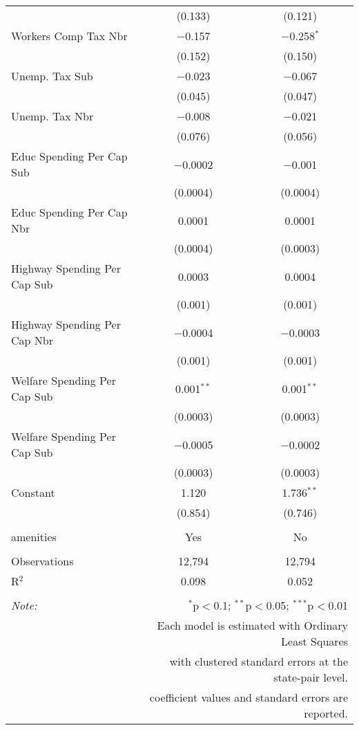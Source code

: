 \begin{table}[!htbp]
\begin{tabular}{@{\extracolsep{5pt}}lcc}
  & (0.133) & (0.121) \\ 
  Workers Comp Tax Nbr & $-$0.157 & $-$0.258$^{*}$ \\ 
  & (0.152) & (0.150) \\ 
  Unemp. Tax Sub & $-$0.023 & $-$0.067 \\ 
  & (0.045) & (0.047) \\ 
  Unemp. Tax Nbr & $-$0.008 & $-$0.021 \\ 
  & (0.076) & (0.056) \\ 
  Educ Spending Per Cap Sub & $-$0.0002 & $-$0.001 \\ 
  & (0.0004) & (0.0004) \\ 
  Educ Spending Per Cap Nbr & 0.0001 & 0.0001 \\ 
  & (0.0004) & (0.0003) \\ 
  Highway Spending Per Cap Sub & 0.0003 & 0.0004 \\ 
  & (0.001) & (0.001) \\ 
  Highway Spending Per Cap Nbr & $-$0.0004 & $-$0.0003 \\ 
  & (0.001) & (0.001) \\ 
  Welfare Spending Per Cap Sub & 0.001$^{**}$ & 0.001$^{**}$ \\ 
  & (0.0003) & (0.0003) \\ 
  Welfare Spending Per Cap Sub & $-$0.0005 & $-$0.0002 \\ 
  & (0.0003) & (0.0003) \\ 
  Constant & 1.120 & 1.736$^{**}$ \\ 
  & (0.854) & (0.746) \\ 
 \hline \\[-1.8ex] 
amenities & Yes & No \\ 
\hline \\[-1.8ex] 
Observations & 12,794 & 12,794 \\ 
R$^{2}$ & 0.098 & 0.052 \\ 
\hline 
\hline \\[-1.8ex] 
\textit{Note:}  & \multicolumn{2}{r}{$^{*}$p$<$0.1; $^{**}$p$<$0.05; $^{***}$p$<$0.01} \\ 
 & \multicolumn{2}{r}{Each model is estimated with Ordinary Least Squares} \\ 
 & \multicolumn{2}{r}{with clustered standard errors at the state-pair level.} \\ 
 & \multicolumn{2}{r}{coefficient values and standard errors are reported.} \\ 
\end{tabular} 
\end{table} 
